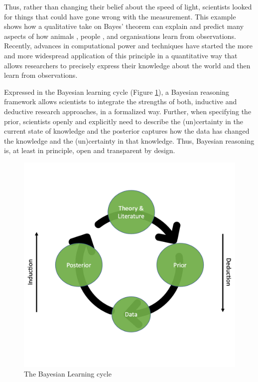 \documentclass[man]{apa7}
\begin{document}
Thus, rather than changing their belief about the speed of light, scientists looked for things that could have gone wrong with the measurement. This example shows how a qualitative take on Bayes’ theorem can explain and predict many aspects of how animals \parencite{o13}, people \parencite{tgk06}, and organisations \parencite{kaj12} learn from observations. Recently, advances in computational power and techniques have started the more and more widespread application of this principle in a quantitative way that allows researchers to precisely express their knowledge about the world and then learn from observations. 

Expressed in the Bayesian learning cycle (Figure \ref{fig:The Bayesian Learning Cycle}), a Bayesian reasoning framework allows scientists to integrate the strengths of both, inductive and deductive research approaches, in a formalized way. Further, when specifying the prior, scientists openly and explicitly need to describe the (un)certainty in the current state of knowledge and the posterior captures how the data has changed the knowledge and the (un)certainty in that knowledge. Thus, Bayesian reasoning is, at least in principle, open and transparent by design.

\begin{figure}[h]
\begin{center}
\includegraphics[width = .65\paperwidth]{learning.png}
\caption{The Bayesian Learning cycle}
\label{fig:The Bayesian Learning Cycle}
\end{center}
\end{figure}
\end{document}
